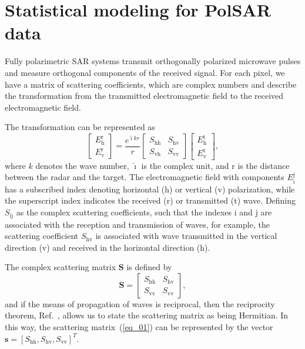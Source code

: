 \documentclass[conference]{IEEEtran}
\begin{document}
\section{Statistical modeling for PolSAR data}\label{sec_02}

Fully polarimetric SAR systems transmit orthogonally polarized microwave pulses and measure orthogonal components of the received signal. 
For each pixel, we have a matrix of scattering coefficients, which are complex numbers and describe the transformation from the transmitted electromagnetic field to the received electromagnetic field.

The transformation can be represented as
\begin{equation*}
 \left[
\begin{array}{c}
	E_{\text{h}}^{\text{r}}   \\
	E_{\text{v}}^{\text{r}}    
\end{array}
\right]
 = \frac{e^{\hat{\imath} kr}}{r}\left[
\begin{array}{cc}
	S_\text{hh}   & S_\text{hv}   \\
	S_\text{vh}   & S_\text{vv}   
\end{array}
\right]
 \left[
\begin{array}{c}
	E_{\text{h}}^{\text{t}}   \\
	E_{\text{v}}^{\text{t}}    
\end{array}
\right],
\end{equation*}
where $k$ denotes the wave number, $\hat{\imath}$ is the complex unit, and $\text{r}$ is the distance between the radar and the target. 
The electromagnetic field with components $E_{\text{i}}^{\text{j}}$ has a subscribed index denoting horizontal ($\text{h}$) or vertical ($\text{v}$) polarization, while the superscript index indicates the received ($\text{r}$) or transmitted ($\text{t}$) wave. 
Defining $S_\text{ij}$ as the complex scattering coefficients, such that the indexes $\text{i}$ and $\text{j}$ are associated with the reception and transmission of waves, for example, the scattering coefficient $S_\text{hv}$ is associated with wave transmitted in the vertical direction ($\text{v}$) and received in the horizontal direction ($\text{h}$).

The complex scattering matrix $\mathbf{S}$ is defined by
\begin{equation}
\mathbf{S} = \left[
\begin{array}{cc}
	S_\text{hh}   & S_\text{hv}   \\
	S_\text{vv}   & S_\text{vv}   
\end{array}
\right],
\label{eq_01}
\end{equation}
and if the means of propagation of waves is reciprocal, then the reciprocity theorem, Ref.~\cite{lp}, allows us to state the scattering matrix as being Hermitian. 
In this way, the scattering matrix~(\ref{eq_01}) can be represented by the vector $\mathbf{s}=[S_\text{hh},S_\text{hv},S_{\text{vv}}]^T$.
\end{document}
